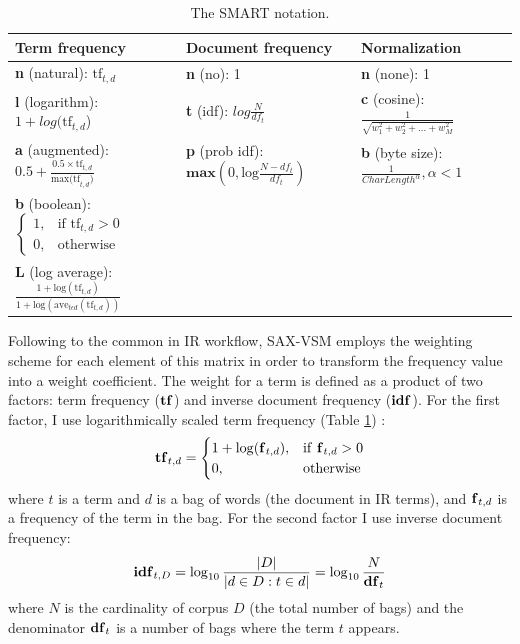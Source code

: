 \begin{table}
\caption{The SMART notation. }
\vspace{0.4cm}
\label{tbl:smart}
{\footnotesize
\begin{tabularx}{\textwidth}{l l l}
\toprule[1pt]
\textbf{Term frequency} &\textbf{Document frequency} &\textbf{Normalization} \\[0.5ex]
\midrule
\textbf{n} (natural):  $\text{tf}_{t,d}$ & \textbf{n} (no): 1 & \textbf{n} (none): 1 \\[2ex]
\textbf{l} (logarithm): $1+log(\text{tf}_{t,d}$) & \textbf{t} (idf): $log\tfrac{N}{df_{t}}$ & \textbf{c} (cosine): $\tfrac{1}{\sqrt{w_1^2 + w_2^2 + ... + w_M^2}}$ \\[2ex]
\textbf{a} (augmented): $0.5 + \tfrac{0.5 \times \text{tf}_{t,d}}{\text{max(tf}_{t,d})}$ & \textbf{p} (prob idf): $\textbf{max}\left( 0,\text{log}\tfrac{N-df_{t}}{df_{t}} \right) $ & 
\textbf{b} (byte size): $\tfrac{1}{CharLength^\alpha}, \alpha < 1 $ \\[2ex]
\textbf{b} (boolean): $\begin{cases} 1, & \text{if tf}_{t,d} > 0 \\ 0, & \text{otherwise} \end{cases} $ & & \\[3ex]
\textbf{L} (log average): $ \tfrac{1+\text{log}(\text{tf}_{t,d})}{1+\text{log}(\text{ave}_{t \epsilon d}( \text{tf}_{t,d}))}$ & & \\[1ex]
\bottomrule[1pt]
\end{tabularx}
}
\end{table}

Following to the common in IR workflow, SAX-VSM employs the \tfidf weighting scheme \cite{citeulike:4469058} for each element 
of this matrix in order to transform the frequency value into a weight coefficient. 
The \tfidf weight for a term is defined as a product of two factors: term frequency ($\text{\textbf{tf}}$) 
and inverse document frequency ($\text{\textbf{idf}}$). 
For the first factor, I use logarithmically scaled term frequency (Table \ref{tbl:smart}) \cite{citeulike:4469058}:
\begin{equation}
 \mbox{\textbf{tf}}_{t, d} =  \begin{cases} 1 + \log(\mbox{\textbf{f}}_{t,d}), &\mbox{if \textbf{f}}_{t,d}>0  \\
0, & \mbox{otherwise} \end{cases}
\end{equation} 
where $t$ is a term and $d$ is a bag of words (the document in IR terms), and $\mbox{\textbf{f}}_{t,d}$ 
is a frequency of the term in the bag.
For the second factor I use inverse document frequency:
\begin{equation}
 \mbox{\textbf{idf}}_{t, D} =  \log_{10}\frac{|D|}{|d \in D : t \in d|} = \log_{10}\frac{N}{\mbox{\textbf{df}}_{t}}
 \label{formula:idf}
\end{equation} 
where $N$ is the cardinality of corpus $D$ (the total number of bags) and the 
denominator $\mbox{\textbf{df}}_{t}$ is a number of bags where the term $t$ appears.

